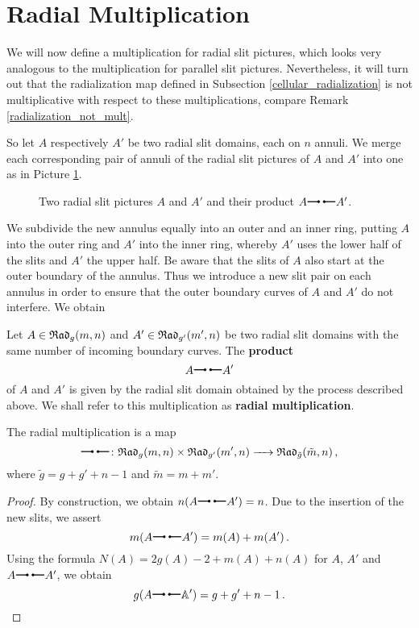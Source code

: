 \section{Radial Multiplication}
\label{homology_operations:radial_multiplication}
We will now define a multiplication for radial slit pictures,
which looks very analogous to the multiplication for parallel slit pictures.
Nevertheless, it will turn out that the radialization map defined in Subsection \ref{cellular_radialization} is not multiplicative with respect to these multiplications, compare Remark \ref{radialization_not_mult}.

So let $A$ respectively $A'$ be two radial slit domains, each on $n$ annuli.
We merge each corresponding pair of annuli of the radial slit pictures of $A$ and $A'$ into one as in Picture \ref{homology_op:radial_mult}.
\begin{figure}[ht]
\centering
{}
\centering
{}
\caption{\label{homology_op:radial_mult} Two radial slit pictures $A$ and $A'$ and their product $A \radmult A'$.}
\end{figure}
We subdivide the new annulus equally into an outer and an inner ring, putting $A$ into the outer ring and $A'$ into the inner ring,
whereby $A'$ uses the lower half of the slits and $A'$ the upper half.
Be aware that the slits of $A$ also start at the outer boundary of the annulus.
Thus we introduce a new slit pair on each annulus in order to ensure that the outer boundary curves of $A$ and $A'$ do not interfere.
We obtain

\begin{defi}
\label{rad_mult_defi}
   Let $A \in {\mathfrak{Rad}_g(m,n)}$ and $A' \in \mathfrak{Rad}_{g'}(m', n)$ be two radial slit domains
   with the same number of incoming boundary curves.
   The \textbf{product} 
   \[ 
      A \radmult A'
   \]
   of $A$ and $A'$ is given by the radial slit domain obtained by the process described above.
   We shall refer to this multiplication as \textbf{radial multiplication}. 
\end{defi}

\begin{prop}
   The radial multiplication is a map
   \[
       \radmult \colon \Rad \times \Radt_{g'}(m', n) \to \Radt_{\tilde g}(\tilde m, n)\,,
   \]
   where $\tilde g = g + g' + n - 1$ and $\tilde m = m + m'$.
\begin{proof}
   By construction, we obtain $n(A \radmult A') = n$.
   Due to the insertion of the new slits, we assert 
   \[
      m(A \radmult A') = m(A) + m(A')\,.
   \]
   Using the formula $N(A) = 2 g(A) - 2 + m(A) + n(A)$ for $A$, $A'$ and $A \radmult A'$,
   we obtain 
   \[
      g(A \radmult \A') = g + g' + n - 1\,.    
   \]
\end{proof}
\end{prop}

